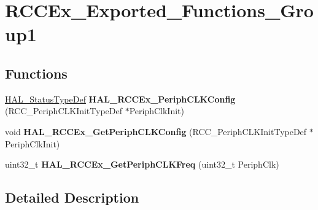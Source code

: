 \hypertarget{group___r_c_c_ex___exported___functions___group1}{}\section{R\+C\+C\+Ex\+\_\+\+Exported\+\_\+\+Functions\+\_\+\+Group1}
\label{group___r_c_c_ex___exported___functions___group1}
\subsection*{Functions}
\begin{DoxyCompactItemize}
\item 
\mbox{\label{group___r_c_c_ex___exported___functions___group1_ga0c0f61a1e2f47cc81bc43d83ba3e0d95}} 
\hyperlink{stm32f4xx__hal__def_8h_a63c0679d1cb8b8c684fbb0632743478f}{H\+A\+L\+\_\+\+Status\+Type\+Def} {\bfseries H\+A\+L\+\_\+\+R\+C\+C\+Ex\+\_\+\+Periph\+C\+L\+K\+Config} (R\+C\+C\+\_\+\+Periph\+C\+L\+K\+Init\+Type\+Def $\ast$Periph\+Clk\+Init)
\item 
\mbox{\label{group___r_c_c_ex___exported___functions___group1_ga754fc5136c63ad52b7c459aafc8a3927}} 
void {\bfseries H\+A\+L\+\_\+\+R\+C\+C\+Ex\+\_\+\+Get\+Periph\+C\+L\+K\+Config} (R\+C\+C\+\_\+\+Periph\+C\+L\+K\+Init\+Type\+Def $\ast$Periph\+Clk\+Init)
\item 
\mbox{\label{group___r_c_c_ex___exported___functions___group1_ga14acaeb88163a6bb0839470b753ba1bd}} 
uint32\+\_\+t {\bfseries H\+A\+L\+\_\+\+R\+C\+C\+Ex\+\_\+\+Get\+Periph\+C\+L\+K\+Freq} (uint32\+\_\+t Periph\+Clk)
\end{DoxyCompactItemize}


\subsection{Detailed Description}
